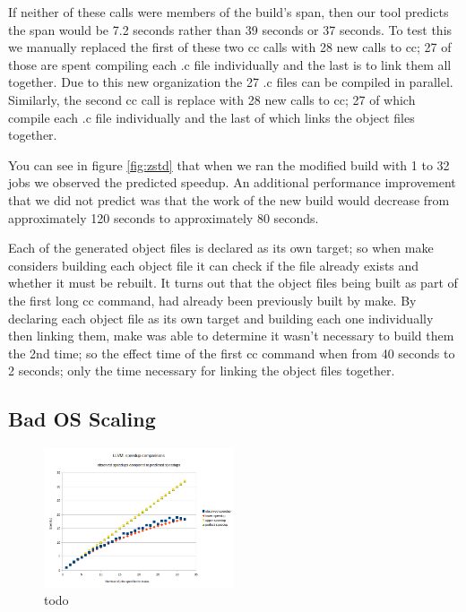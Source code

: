 \documentclass[sigplan,10pt,review,authorversion]{acmart}\settopmatter{printfolios=true,printccs=false,printacmref=false}
\begin{document}
If neither of these calls were members of the build's span, then our tool predicts the span would be
7.2 seconds rather than 39 seconds or 37 seconds.  To test this we manually replaced the first of
these two cc calls with 28 new calls to cc; 27 of those are spent compiling each .c file individually
and the last is to link them all together.  Due to this new organization the 27 .c files can be
compiled in parallel.  Similarly, the second cc call is replace with 28 new calls to cc; 27 of which
compile each .c file individually and the last of which links the object files together.

You can see in figure \ref{fig:zstd} that when we ran the modified build with 1 to 32 jobs we
observed the predicted speedup.  An additional performance improvement that we did not predict was
that the work of the new build would decrease from approximately 120 seconds to approximately 80 seconds.

Each of the generated object files is declared as its own target; so when make considers building
each object file it can check if the file already exists and whether it must be rebuilt.  It turns
out that the object files being built as part of the first long cc command, had already been
previously built by make.  By declaring each object file as its own target and building each one
individually then linking them, make was able to determine it wasn't necessary to build them the
2nd time; so the effect time of the first cc command when from 40 seconds to 2 seconds; only the
time necessary for linking the object files together.

\subsection{Bad OS Scaling}

\begin{figure}[]
  \includegraphics[width=0.5\textwidth]{llvm-speedup}
  \caption{todo}
  \label{fig:llvm}
\end{figure}
\end{document}
